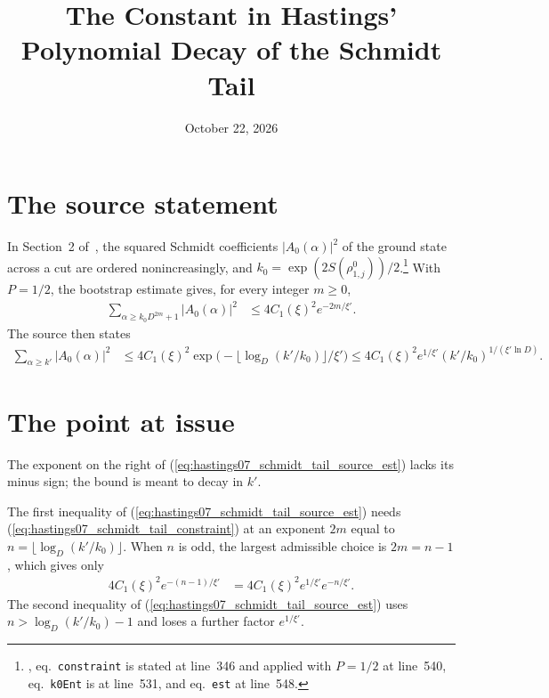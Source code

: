 \documentclass{article}
\title{The Constant in Hastings' Polynomial Decay of the Schmidt Tail}
\author{}
\date{October 22, 2026}
\begin{document}
\maketitle
{}

\section{The source statement}

In Section~2 of~\cite{Hastings2007AreaLaw}, the
squared Schmidt coefficients $|A_0(\alpha)|^2$ of the ground state across a cut
are ordered nonincreasingly, and
$k_0=\exp(2S(\rho^0_{1,j}))/2$.\footnote{,
    eq.~\texttt{constraint} is stated at line~346 and applied with $P=1/2$
    at line~540, eq.~\texttt{k0Ent} is at line~531, and eq.~\texttt{est} at
    line~548.}
With $P=1/2$, the bootstrap estimate gives, for every integer $m\ge0$,
\begin{align}
    \sum_{\alpha\ge k_0D^{2m}+1}|A_0(\alpha)|^2
     & \le 4C_1(\xi)^2e^{-2m/\xi'}.
    \label{eq:hastings07_schmidt_tail_constraint}
\end{align}
The source then states
\begin{align}
    \sum_{\alpha\ge k'}|A_0(\alpha)|^2
     & \le 4C_1(\xi)^2\exp\bigl(-\lfloor\log_D(k'/k_0)\rfloor/\xi'\bigr)
    \le 4C_1(\xi)^2e^{1/\xi'}(k'/k_0)^{1/(\xi'\ln D)}.
    \label{eq:hastings07_schmidt_tail_source_est}
\end{align}

\section{The point at issue}

The exponent on the right of (\ref{eq:hastings07_schmidt_tail_source_est})
lacks its minus sign; the bound is meant to decay in $k'$.

The first inequality of (\ref{eq:hastings07_schmidt_tail_source_est}) needs
(\ref{eq:hastings07_schmidt_tail_constraint}) at an exponent $2m$ equal to
$n=\lfloor\log_D(k'/k_0)\rfloor$. When $n$ is odd, the largest admissible
choice is $2m=n-1$, which gives only
\begin{align}
    4C_1(\xi)^2e^{-(n-1)/\xi'}
     & = 4C_1(\xi)^2e^{1/\xi'}e^{-n/\xi'}.
    \label{eq:hastings07_schmidt_tail_odd}
\end{align}
The second inequality of (\ref{eq:hastings07_schmidt_tail_source_est}) uses
$n>\log_D(k'/k_0)-1$ and loses a further factor $e^{1/\xi'}$.
\end{document}
